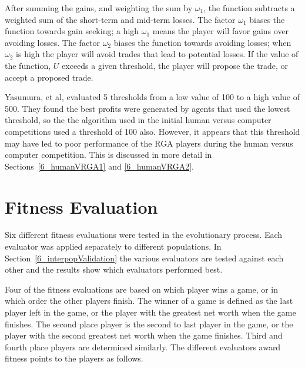 After summing the gains, and weighting the sum by \(\omega_1\), the function
subtracts a weighted sum of the short-term and mid-term losses. The factor
\(\omega_1\) biases the function towards gain seeking; a high \(\omega_1\) means
the player will favor gains over avoiding losses. The factor \(\omega_2\) biases
the function towards avoiding losses; when \(\omega_2\) is high the player will
avoid trades that lead to potential losses. If the value of the function, \(U\)
exceeds a given threshold, the player will propose the trade, or accept a
proposed trade. 

Yasumura, et al, evaluated 5 thresholds from a low value of 100 to a high value
of 500. They found the best profits were generated by agents that used the
lowest threshold, so the the algorithm used in the initial human versus computer
competitions used a threshold of 100 also. However, it appears that this
threshold may have led to poor performance of the RGA players during the human
versus computer competition. This is discussed in more detail in
Sections~\ref{6_humanVRGA1} and \ref{6_humanVRGA2}.

\section{Fitness Evaluation} \label{5_fitnesseval}

Six different fitness evaluations were tested in the evolutionary process. Each
evaluator was applied separately to different populations. In 
Section~\ref{6_interpopValidation} the various evaluators are tested against 
each other and the results show which evaluators performed best.

Four of the fitness evaluations are based on which player wins a game, or in
which order the other players finish. The winner of a game is defined as the
last player left in the game, or the player with the greatest net worth when the
game finishes. The second place player is the second to last player in the game,
or the player with the second greatest net worth when the game finishes. Third
and fourth place players are determined similarly. The different evaluators
award fitness points to the players as follows.

